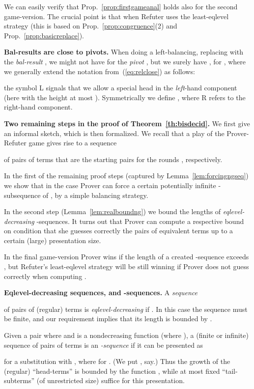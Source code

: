 \documentclass{llncs}
\begin{document}
\smallskip
We can easily verify that Prop.~\ref{prop:firstgameanal}
holds also for the second game-version. The crucial point is that
 when Refuter uses the
least-eqlevel strategy 
(this is based on Prop.~\ref{prop:congruence}(2) and 
Prop.~\ref{prop:basicreplace}).

\textbf{Bal-results are close to pivots.}
When doing a left-balancing, 
replacing 
 with 
the \emph{bal-result}
,
we might not have 
for the \emph{pivot} ,
 but we surely 
have
, for ,
where we generally extend the notation from~(\ref{eq:relclose})
as follows: 

the symbol \textsc{L} signals that we allow a special head
in the \emph{left}-hand component (here with the height at most ).
Symmetrically 
we define , 
where \textsc{R} refers to the right-hand component.

\smallskip

\textbf{Two remaining steps 
in the proof of Theorem~\ref{th:bisdecid}.}
 We first give an informal sketch, which is then formalized.
 We recall that a play of the Prover-Refuter game gives
rise to a sequence 

of pairs of terms that are the starting pairs for 
the rounds , respectively.

In the first of the remaining proof steps
(captured by Lemma~\ref{lem:forcingngseq})
we show that in the case  Prover can force a certain
potentially 
infinite -subsequence of , by a
simple balancing strategy.

In the second step
(Lemma~\ref{lem:realboundng}) we bound
the lengths of \emph{eqlevel-decreasing} -sequences.
It turns out that Prover can compute a respective bound
 on condition that she guesses correctly the pairs
of equivalent terms up to a certain (large) presentation size.

In the final game-version Prover wins if the length of a created
-sequence exceeds , but
Refuter's least-eqlevel strategy will be
still winning if Prover does not guess correctly when computing 
.



\textbf{Eqlevel-decreasing sequences, and -sequences.}
A \emph{sequence}  

of pairs of (regular) terms is \emph{eqlevel-decreasing} if 
. 
In this case the sequence must be finite, and our requirement
 implies that its length is
bounded by . 

Given a pair  where  and
 is a nondecreasing function
(where ), 
a (finite or infinite) sequence of pairs of terms
is an \emph{-sequence} if it can be presented as
\begin{center}

\end{center}
for a substitution 
with , where 
 for . 
(We put , say.)
Thus the growth of the (regular) ``head-terms''  is bounded by
the function , while at most  fixed 
``tail-subterms'' (of unrestricted
size)
suffice for this presentation.
\end{document}
